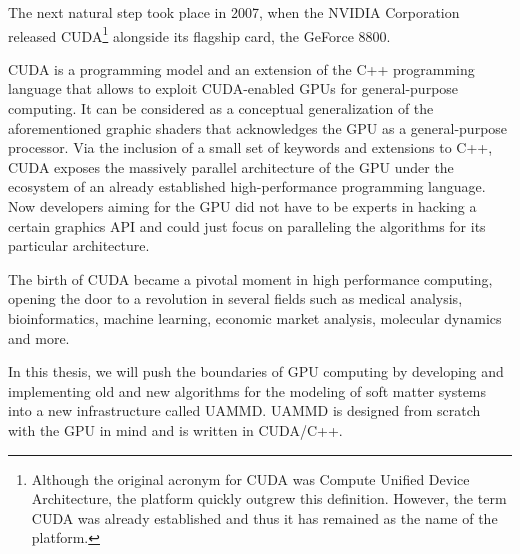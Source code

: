\documentclass[ twoside,openright,titlepage,numbers=noenddot,%
headinclude,footinclude,cleardoublepage=empty,abstract=on,
BCOR=5mm,paper=a4,fontsize=11pt, dvipsnames
]{scrreprt}
\newcommand{\uammd}{\gls{UAMMD}\xspace}
\newcommand{\gpu}{\gls{GPU}\xspace}
\begin{document}
The next natural step took place in 2007, when the NVIDIA Corporation released CUDA\cite{cuda}\footnote{Although the original acronym for CUDA was Compute Unified Device Architecture, the platform quickly outgrew this definition. However, the term CUDA was already established and thus it has remained as the name of the platform.} alongside its flagship card, the GeForce 8800.

CUDA is a programming model and an extension of the C++ programming language that allows to exploit CUDA-enabled \glspl{GPU} for general-purpose computing. It can be considered as a conceptual generalization of the aforementioned graphic shaders that acknowledges the \gpu as a general-purpose processor. Via the inclusion of a small set of keywords and extensions to C++, CUDA exposes the massively parallel architecture of the \gpu under the ecosystem of an already established high-performance programming language.
Now developers aiming for the \gpu did not have to be experts in hacking a certain graphics \gls{API} and could just focus on paralleling the algorithms for its particular architecture.

The birth of CUDA became a pivotal moment in high performance computing, opening the door to a revolution in several fields such as medical analysis, bioinformatics, machine learning, economic market analysis, molecular dynamics and more.

In this thesis, we will push the boundaries of \gpu computing by developing and implementing old and new algorithms for the modeling of soft matter systems into a new infrastructure called \uammd. \uammd is designed from scratch with the \gpu in mind and is written in CUDA/C++.
\end{document}
